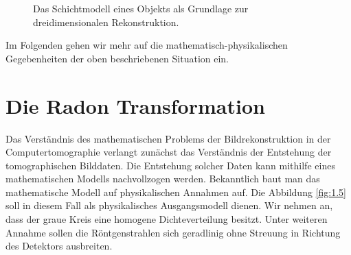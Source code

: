 \begin{figure}[h]
	\caption{Das Schichtmodell eines Objekts als Grundlage zur dreidimensionalen Rekonstruktion.}
	\label{fig:1.4}
\end{figure} 

Im Folgenden gehen wir mehr auf die mathematisch-physikalischen Gegebenheiten der oben beschriebenen Situation ein. 

\section*{Die Radon Transformation}
\label{cha:1.2}

Das Verständnis des mathematischen Problems der Bildrekonstruktion in der Computertomographie verlangt zunächst das Verständnis der Entstehung der tomographischen Bilddaten. Die Entstehung solcher Daten kann mithilfe eines mathematischen Modells nachvollzogen werden. Bekanntlich baut man das mathematische Modell auf physikalischen Annahmen auf. Die Abbildung \ref{fig:1.5} soll in diesem Fall als physikalisches Ausgangsmodell dienen. Wir nehmen an, dass der graue Kreis eine homogene Dichteverteilung besitzt. Unter weiteren Annahme sollen die Röntgenstrahlen sich geradlinig ohne Streuung in Richtung des Detektors ausbreiten.

